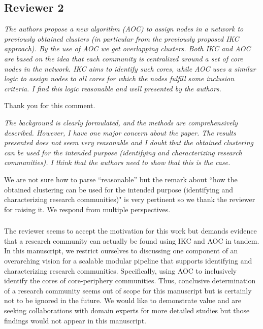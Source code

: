 \documentclass[11pt, oneside]{article}   	%
\begin{document}
\subsection*{Reviewer 2} \emph{The authors propose a new algorithm (AOC) to assign nodes in a network to previously obtained clusters (in particular from the previously proposed IKC approach). By the use of AOC we get overlapping clusters. Both IKC and AOC are based on the idea that each community is centralized around a set of core nodes in the network. IKC aims to identify such cores, while AOC uses a similar logic to assign nodes to all cores for which the nodes fulfill some inclusion criteria. I find this logic reasonable and well presented by the authors.} 

Thank you for this comment.

\emph{The background is clearly formulated, and the methods are comprehensively described. However, I have one major concern about the paper. The results presented does not seem very reasonable and I doubt that the obtained clustering can be used for the intended purpose (identifying and characterizing research communities). I think that the authors need to show that this is the case.}

We are not sure how to parse ``reasonable'' but the remark about ``how the obtained clustering can be used for the intended purpose (identifying and characterizing research communities)" is very pertinent so we thank the reviewer for raising it. We respond from multiple perspectives.

\subsubsection{}The reviewer seems to accept the motivation for this work but demands evidence that a research community can actually be found using IKC and AOC in tandem. In this manuscript, we restrict ourselves to discussing one component of an overarching vision for a scalable modular pipeline that supports identifying and characterizing research communities. Specifically, using AOC to inclusively identify the cores of core-periphery communities. Thus, conclusive determination of a research community seems out of scope for this manuscript but is certainly not to be ignored in the future. We would like to demonstrate value and are seeking collaborations with domain experts for more detailed studies but those findings would not appear in this manuscript. 
\end{document}
